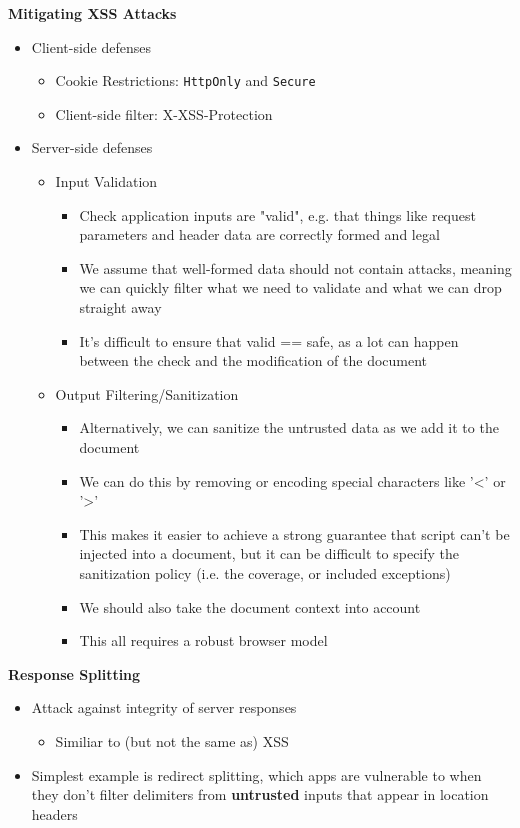 \documentclass{article}
\begin{document}
\textbf{Mitigating XSS Attacks}
\begin{itemize}
    \item Client-side defenses
    \begin{itemize}
        \item Cookie Restrictions: \verb|HttpOnly| and \verb|Secure|
        \item Client-side filter: X-XSS-Protection
    \end{itemize}
    \item Server-side defenses
    \begin{itemize}
        \item Input Validation
        \begin{itemize}
            \item Check application inputs are "valid", e.g. that things like request parameters and header data are correctly formed and legal
            \item We assume that well-formed data should not contain attacks, meaning we can quickly filter what we need to validate and what we can drop straight away
            \item It's difficult to ensure that valid == safe, as a lot can happen between the check and the modification of the document
        \end{itemize}
        \item Output Filtering/Sanitization
        \begin{itemize}
            \item Alternatively, we can sanitize the untrusted data as we add it to the document
            \item We can do this by removing or encoding special characters like '<' or '>'
            \item This makes it easier to achieve a strong guarantee that script can't be injected into a document, but it can be difficult to specify the sanitization policy (i.e. the coverage, or included exceptions)
            \item We should also take the document context into account
            \item This all requires a robust browser model
        \end{itemize}
    \end{itemize}
\end{itemize}

\textbf{Response Splitting}
\begin{itemize}
    \item Attack against integrity of server responses
    \begin{itemize}
        \item Similiar to (but not the same as) XSS
    \end{itemize}
    \item Simplest example is redirect splitting, which apps are vulnerable to when they don't filter delimiters from \textbf{untrusted} inputs that appear in location headers
\end{itemize}
\end{document}
